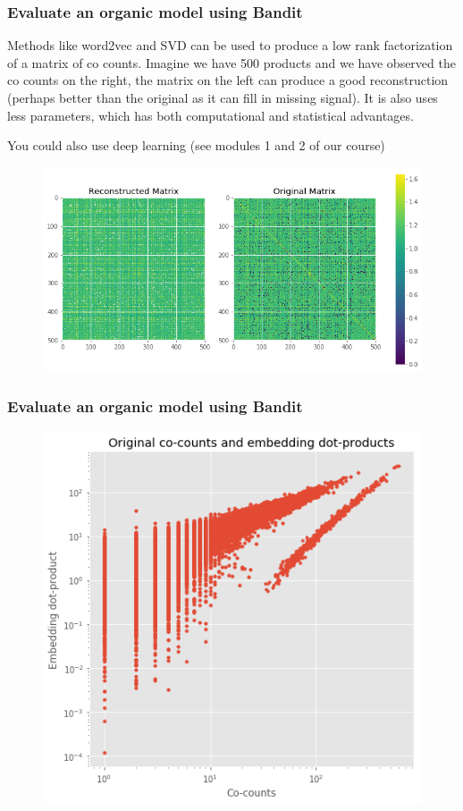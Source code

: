 \begin{frame}
  \frametitle{Evaluate an organic model using Bandit}

  Methods like word2vec and SVD can be used to produce a low rank factorization of a matrix of co counts.  Imagine we have 500 products and we have observed the co counts on the right, the matrix on the left can produce a good reconstruction (perhaps better than the original as it can fill in missing signal).  It is also uses less parameters, which has both computational and statistical advantages.

  You could also use deep learning (see modules 1 and 2 of our course)

  \begin{figure}[h!]
\includegraphics[scale=0.4]{images/evalorganicwithbandit0.png}
\centering
\label{motex1}
\end{figure}
\end{frame}


\begin{frame}
  \frametitle{Evaluate an organic model using Bandit}
\begin{figure}[h!]
\includegraphics[scale=0.4]{images/evalorganicwithbandit1.png}
\centering
\label{motex1}
\end{figure}
\end{frame}


